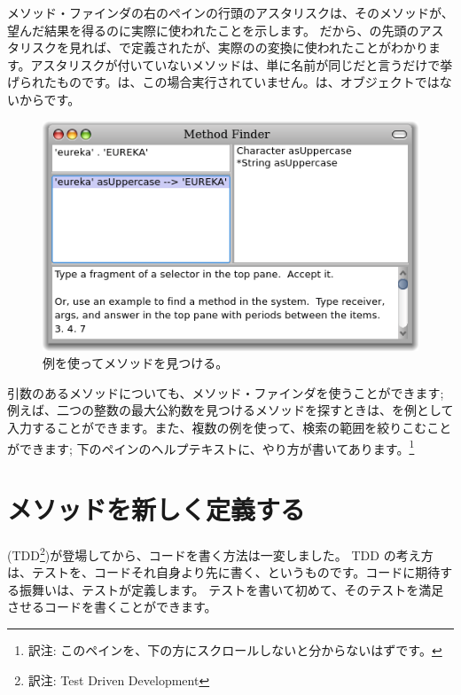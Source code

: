 \documentclass[a4paper,10pt,twoside]{book}
\begin{document}
メソッド・ファインダの右のペインの行頭のアスタリスクは、そのメソッドが、望んだ結果を得るのに実際に使われたことを示します。
だから、の先頭のアスタリスクを見れば、で定義されたが、実際のの変換に使われたことがわかります。アスタリスクが付いていないメソッドは、単に名前が同じだと言うだけで挙げられたものです。は、この場合実行されていません。は、オブジェクトではないからです。

\begin{figure}[hbt]
\centerline {\includegraphics[width=\textwidth]{MethodFinder-example1}}
\caption{例を使ってメソッドを見つける。
}
\end{figure}

引数のあるメソッドについても、メソッド・ファインダを使うことができます; 例えば、二つの整数の最大公約数を見つけるメソッドを探すときは、を例として入力することができます。また、複数の例を使って、検索の範囲を絞りこむことができます; 下のペインのヘルプテキストに、やり方が書いてあります。\footnote{訳注: このペインを、下の方にスクロールしないと分からないはずです。}

\section{メソッドを新しく定義する}

\cite{Beck03a} (TDD\footnote{訳注: Test Driven Development})が登場してから、コードを書く方法は一変しました。
TDD の考え方は、テストを、コードそれ自身より先に書く、というものです。コードに期待する振舞いは、テストが定義します。
テストを書いて初めて、そのテストを満足させるコードを書くことができます。
\end{document}
